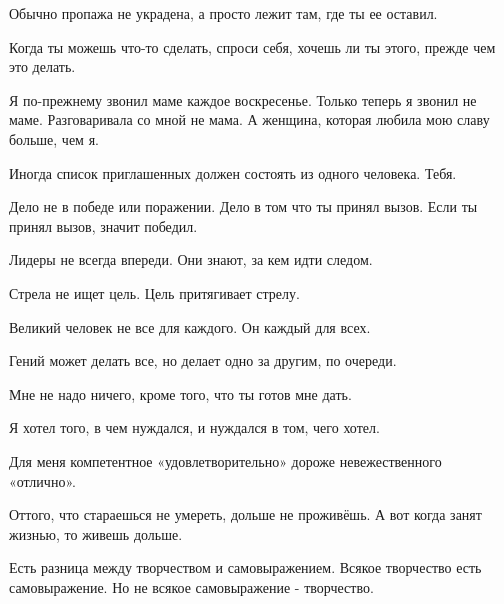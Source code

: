 Обычно пропажа не украдена, а просто лежит там, где ты ее оставил. 

Когда ты можешь что-то сделать, спроси себя, хочешь ли ты этого, прежде чем это
делать. 

Я по-прежнему звонил маме каждое воскресенье. Только теперь я звонил не маме.
Разговаривала со мной не мама. А женщина, которая любила мою славу больше, чем
я. 

Иногда список приглашенных должен состоять из одного человека. Тебя. 

Дело не в победе или поражении. Дело в том что ты принял вызов. Если ты принял
вызов, значит победил.

Лидеры не всегда впереди. Они знают, за кем идти следом.

Стрела не ищет цель. Цель притягивает стрелу.

Великий человек не все для каждого. Он каждый для всех. 

Гений может делать все, но делает одно за другим, по очереди.

Мне не надо ничего, кроме того, что ты готов мне дать.

Я хотел того, в чем нуждался, и нуждался в том, чего хотел.

Для меня компетентное «удовлетворительно» дороже невежественного «отлично».

Оттого, что стараешься не умереть, дольше не проживёшь. А вот когда занят
жизнью, то живешь дольше.

Есть разница между творчеством и самовыражением. Всякое творчество есть
самовыражение. Но не всякое самовыражение - творчество.

